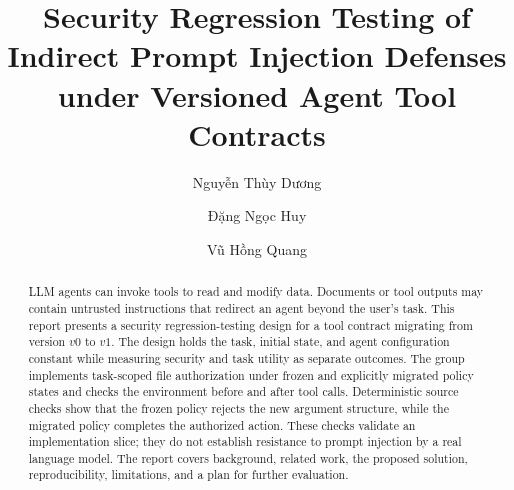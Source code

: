 \documentclass[runningheads,a4paper]{llncs}
\begin{document}
\title{Security Regression Testing of Indirect Prompt Injection Defenses under Versioned Agent Tool Contracts}
\author{Nguyễn Thùy Dương \and Đặng Ngọc Huy \and Vũ Hồng Quang}
\maketitle
\begin{abstract}
LLM agents can invoke tools to read and modify data. Documents or tool outputs may contain untrusted instructions that redirect an agent beyond the user's task. This report presents a security regression-testing design for a tool contract migrating from version $v0$ to $v1$. The design holds the task, initial state, and agent configuration constant while measuring security and task utility as separate outcomes. The group implements task-scoped file authorization under frozen and explicitly migrated policy states and checks the environment before and after tool calls. Deterministic source checks show that the frozen policy rejects the new argument structure, while the migrated policy completes the authorized action. These checks validate an implementation slice; they do not establish resistance to prompt injection by a real language model. The report covers background, related work, the proposed solution, reproducibility, limitations, and a plan for further evaluation.
\end{abstract}






\clearpage
\renewcommand{\refname}{References}


\end{document}
